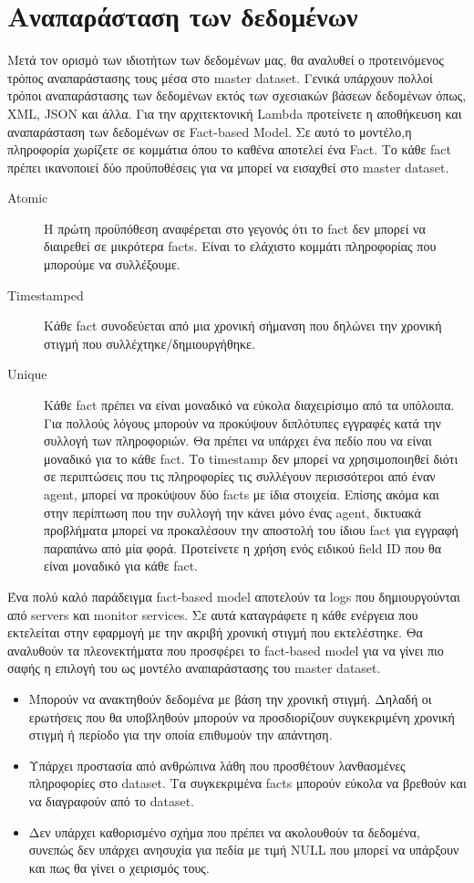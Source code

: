 \section{Αναπαράσταση των δεδομένων}
Μετά τον ορισμό των ιδιοτήτων των δεδομένων μας, θα αναλυθεί ο προτεινόμενος τρόπος αναπαράστασης τους μέσα στο master dataset. Γενικά υπάρχουν πολλοί τρόποι αναπαράστασης των δεδομένων εκτός των σχεσιακών βάσεων δεδομένων όπως, XML, JSON και άλλα.
\newline
Για την αρχιτεκτονική Lambda προτείνετε η αποθήκευση και αναπαράσταση των δεδομένων σε Fact-based Model. Σε αυτό το μοντέλο,η πληροφορία χωρίζετε σε κομμάτια όπου το καθένα αποτελεί ένα Fact. Το κάθε fact πρέπει ικανοποιεί δύο προϋποθέσεις για να μπορεί να εισαχθεί στο master dataset.

\begin{description}
\item [Atomic] Η πρώτη προϋπόθεση αναφέρεται στο γεγονός ότι το fact δεν μπορεί να διαιρεθεί σε μικρότερα  facts. Είναι το ελάχιστο κομμάτι πληροφορίας που μπορούμε να συλλέξουμε.
\item [Timestamped] Κάθε fact συνοδεύεται από μια χρονική σήμανση που δηλώνει την χρονική στιγμή που συλλέχτηκε/δημιουργήθηκε.
\item [Unique] Κάθε fact πρέπει να είναι μοναδικό να εύκολα διαχειρίσιμο από τα υπόλοιπα. Για πολλούς λόγους μπορούν να προκύψουν διπλότυπες εγγραφές κατά την συλλογή των πληροφοριών. Θα πρέπει να υπάρχει ένα πεδίο που να είναι μοναδικό για το κάθε fact. Το timestamp δεν μπορεί να χρησιμοποιηθεί διότι σε περιπτώσεις που τις πληροφορίες τις συλλέγουν περισσότεροι από έναν agent, μπορεί να προκύψουν δύο facts με ίδια στοιχεία. Επίσης ακόμα και στην περίπτωση που την συλλογή την κάνει μόνο ένας agent, δικτυακά προβλήματα μπορεί να προκαλέσουν την αποστολή του ίδιου fact για εγγραφή παραπάνω από μία φορά. Προτείνετε η χρήση ενός ειδικού field ID που θα είναι μοναδικό για κάθε fact.
\end{description}
Ένα πολύ καλό παράδειγμα fact-based model αποτελούν τα logs που δημιουργούνται από servers και monitor services. Σε αυτά καταγράφετε η κάθε ενέργεια που εκτελείται στην εφαρμογή με την ακριβή χρονική στιγμή που εκτελέστηκε.
\newline
Θα αναλυθούν τα πλεονεκτήματα που προσφέρει το fact-based model για να γίνει πιο σαφής η επιλογή του ως μοντέλο αναπαράστασης του master dataset.
\begin{itemize}
\item Μπορούν να ανακτηθούν δεδομένα με βάση την χρονική στιγμή. Δηλαδή οι ερωτήσεις που θα υποβληθούν μπορούν να προσδιορίζουν συγκεκριμένη χρονική στιγμή ή περίοδο για την οποία επιθυμούν την απάντηση.
\item Υπάρχει προστασία από ανθρώπινα λάθη που προσθέτουν λανθασμένες πληροφορίες στο dataset. Τα συγκεκριμένα facts μπορούν εύκολα να βρεθούν και να διαγραφούν από το dataset.
\item Δεν υπάρχει καθορισμένο σχήμα που πρέπει να ακολουθούν τα δεδομένα, συνεπώς δεν υπάρχει ανησυχία για πεδία με τιμή NULL που μπορεί να υπάρξουν και πως θα γίνει ο χειρισμός τους.
\end{itemize}

